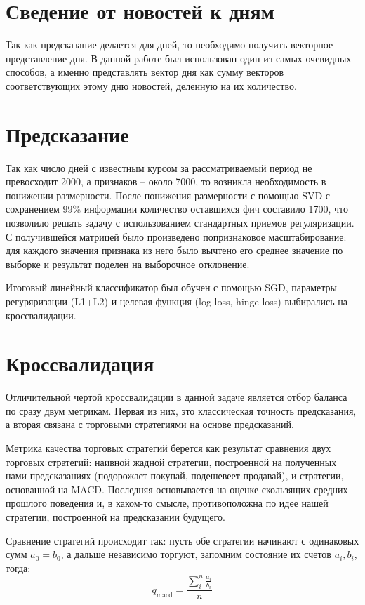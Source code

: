 \documentclass[pdftex,ptm,14pt,a4paper]{report}
\begin{document}
\section{Сведение от новостей к дням}

Так как предсказание делается для дней, то необходимо получить векторное представление дня.
В данной работе был использован один из самых очевидных способов, а именно представлять вектор дня как сумму векторов соответствующих этому дню новостей, деленную на их количество.

\section{Предсказание}

Так как число дней с известным курсом за рассматриваемый период не превосходит 2000, а признаков -- около 7000, то возникла
необходимость в понижении размерности. После понижения размерности с помощью SVD\cite{svd} с сохранением
99\% информации количество оставшихся фич составило 1700, что позволило решать задачу с использованием стандартных
приемов регуляризации. С получившейся матрицей было произведено попризнаковое
масштабирование: для каждого значения признака из него было вычтено его среднее значение по выборке и результат поделен на
выборочное отклонение.

Итоговый линейный классификатор был обучен с помощью SGD\cite{sgd}, параметры регуряризации (L1+L2) и целевая функция (log-loss, hinge-loss) выбирались на кроссвалидации.

\section{Кроссвалидация}

Отличительной чертой кроссвалидации в данной задаче является отбор баланса по сразу двум метрикам. Первая из них, это
классическая точность предсказания, а вторая связана с торговыми стратегиями на основе предсказаний. 

Метрика качества торговых стратегий берется как результат сравнения двух торговых стратегий: наивной жадной стратегии, построенной на полученных нами предсказаниях (подорожает-покупай, подешевеет-продавай), и стратегии, основанной на MACD\cite{macd}. Последняя основывается на оценке скользящих средних прошлого поведения и, в каком-то смысле, противоположна по идее нашей стратегии,
построенной на предсказании будущего.

Сравнение стратегий происходит так: пусть обе стратегии начинают с одинаковых сумм $a_0 = b_0$, а дальше независимо
торгуют, запомним состояние их счетов $a_i, b_i$, тогда:
\[ q_\text{macd} = \frac{\sum_i^n \frac{a_i}{b_i}}{n} \]
\end{document}
